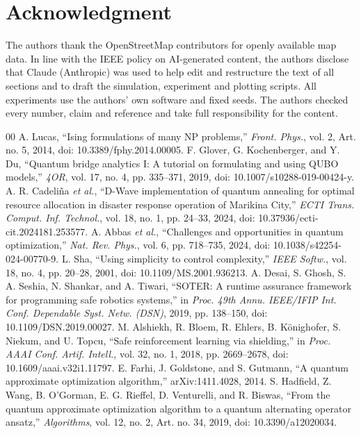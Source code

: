 \documentclass[conference]{IEEEtran}
\begin{document}
\section*{Acknowledgment}
The authors thank the OpenStreetMap contributors for openly available map data.
In line with the IEEE policy on AI-generated content, the authors disclose that Claude (Anthropic) was used to help edit and restructure the text of all sections and to draft the simulation, experiment and plotting scripts. All experiments use the authors' own software and fixed seeds. The authors checked every number, claim and reference and take full responsibility for the content.

\balance
\begin{thebibliography}{00}
 A. Lucas, ``Ising formulations of many NP problems,'' \textit{Front. Phys.}, vol. 2, Art. no. 5, 2014, doi: 10.3389/fphy.2014.00005.
 F. Glover, G. Kochenberger, and Y. Du, ``Quantum bridge analytics I: A tutorial on formulating and using QUBO models,'' \textit{4OR}, vol. 17, no. 4, pp. 335--371, 2019, doi: 10.1007/s10288-019-00424-y.
 A. R. Cadeli\~{n}a \textit{et al.}, ``D-Wave implementation of quantum annealing for optimal resource allocation in disaster response operation of Marikina City,'' \textit{ECTI Trans. Comput. Inf. Technol.}, vol. 18, no. 1, pp. 24--33, 2024, doi: 10.37936/ecti-cit.2024181.253577.
 A. Abbas \textit{et al.}, ``Challenges and opportunities in quantum optimization,'' \textit{Nat. Rev. Phys.}, vol. 6, pp. 718--735, 2024, doi: 10.1038/s42254-024-00770-9.
 L. Sha, ``Using simplicity to control complexity,'' \textit{IEEE Softw.}, vol. 18, no. 4, pp. 20--28, 2001, doi: 10.1109/MS.2001.936213.
 A. Desai, S. Ghosh, S. A. Seshia, N. Shankar, and A. Tiwari, ``SOTER: A runtime assurance framework for programming safe robotics systems,'' in \textit{Proc. 49th Annu. IEEE/IFIP Int. Conf. Dependable Syst. Netw. (DSN)}, 2019, pp. 138--150, doi: 10.1109/DSN.2019.00027.
 M. Alshiekh, R. Bloem, R. Ehlers, B. K\"{o}nighofer, S. Niekum, and U. Topcu, ``Safe reinforcement learning via shielding,'' in \textit{Proc. AAAI Conf. Artif. Intell.}, vol. 32, no. 1, 2018, pp. 2669--2678, doi: 10.1609/aaai.v32i1.11797.
 E. Farhi, J. Goldstone, and S. Gutmann, ``A quantum approximate optimization algorithm,'' arXiv:1411.4028, 2014.
 S. Hadfield, Z. Wang, B. O'Gorman, E. G. Rieffel, D. Venturelli, and R. Biswas, ``From the quantum approximate optimization algorithm to a quantum alternating operator ansatz,'' \textit{Algorithms}, vol. 12, no. 2, Art. no. 34, 2019, doi: 10.3390/a12020034.

\end{thebibliography}
\end{document}
